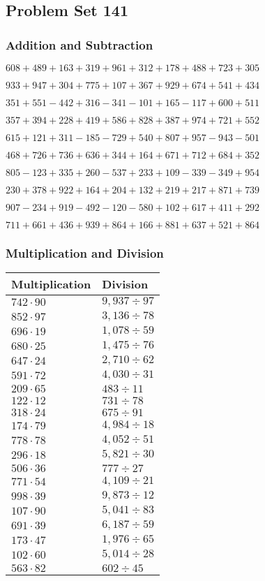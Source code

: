 \hypertarget{problem-set-141}{%
\subsection{Problem Set 141}\label{problem-set-141}}

\hypertarget{addition-and-subtraction}{%
\subsubsection{Addition and
Subtraction}\label{addition-and-subtraction}}

\(608 +489 +163 +319 +961 +312 +178 +488 +723 +305\)

\(933 +947 +304 +775 +107 +367 +929 +674 +541 +434\)

\(351 +551 - 442 +316 - 341 - 101 +165 - 117 +600 +511\)

\(357 +394 +228 +419 +586 +828 +387 +974 +721 +552\)

\(615 +121 +311 - 185 - 729 +540 +807 +957 - 943 - 501\)

\(468 +726 +736 +636 +344 +164 +671 +712 +684 +352\)

\(805 - 123 +335 +260 - 537 +233 +109 - 339 - 349 +954\)

\(230 +378 +922 +164 +204 +132 +219 +217 +871 +739\)

\(907 - 234 +919 - 492 - 120 - 580 +102 +617 +411 +292\)

\(711 +661 +436 +939 +864 +166 +881 +637 +521 +864\)

\hypertarget{multiplication-and-division}{%
\subsubsection{Multiplication and
Division}\label{multiplication-and-division}}

\begin{longtable}[]{@{}ll@{}}
\toprule
Multiplication & Division\tabularnewline
\midrule
\endhead
\(742 \cdot 90\) & \(9,937÷97\)\tabularnewline
\(852 \cdot 97\) & \(3,136 ÷78\)\tabularnewline
\(696 \cdot 19\) & \(1,078÷59\)\tabularnewline
\(680 \cdot 25\) & \(1,475÷76\)\tabularnewline
\(647 \cdot 24\) & \(2,710÷62\)\tabularnewline
\(591 \cdot 72\) & \(4,030÷31\)\tabularnewline
\(209 \cdot 65\) & \(483÷11\)\tabularnewline
\(122 \cdot 12\) & \(731÷78\)\tabularnewline
\(318 \cdot 24\) & \(675÷91\)\tabularnewline
\(174 \cdot 79\) & \(4,984÷18\)\tabularnewline
\(778 \cdot 78\) & \(4,052÷51\)\tabularnewline
\(296 \cdot 18\) & \(5,821÷30\)\tabularnewline
\(506 \cdot 36\) & \(777÷27\)\tabularnewline
\(771 \cdot 54\) & \(4,109÷21\)\tabularnewline
\(998 \cdot 39\) & \(9,873÷12\)\tabularnewline
\(107 \cdot 90\) & \(5,041÷83\)\tabularnewline
\(691 \cdot 39\) & \(6,187÷59\)\tabularnewline
\(173 \cdot 47\) & \(1,976÷65\)\tabularnewline
\(102 \cdot 60\) & \(5,014÷28\)\tabularnewline
\(563 \cdot 82\) & \(602÷45\)\tabularnewline
\bottomrule
\end{longtable}
